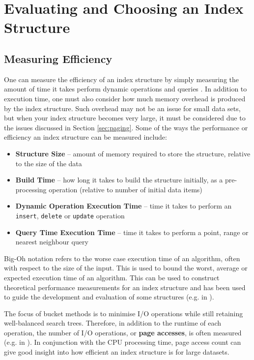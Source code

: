 \section{Evaluating and Choosing an Index Structure}
\label{sec:comparison}

\subsection{Measuring Efficiency}
\label{sec:measuring-efficiency}

One can measure the efficiency of an index structure by simply measuring the amount of time it takes perform dynamic operations and queries \cite{dynamic-data-structures}. In addition to execution time, one must also consider how much memory overhead is produced by the index structure. Such overhead may not be an issue for small data sets, but when your index structure becomes very large, it must be considered due to the issues discussed in Section \ref{sec:paging}. Some of the ways the performance or efficiency an index structure can be measured include:
\begin{itemize}
	\item \textbf{Structure Size} -- amount of memory required to store the structure, relative to the size of the data
	\item \textbf{Build Time} -- how long it takes to build the structure initially, as a pre-processing operation (relative to number of initial data items)
	\item \textbf{Dynamic Operation Execution Time} -- time it takes to perform an \texttt{insert}, \texttt{delete} or \texttt{update} operation
	\item \textbf{Query Time Execution Time} -- time it takes to perform a point, range or nearest neighbour query
\end{itemize}
Big-Oh notation \cite{design-analysis-algorithms} refers to the worse case execution time of an algorithm, often with respect to the size of the input. This is used to bound the worst, average or expected execution time of an algorithm. This can be used to construct theoretical performance measurements for an index structure and has been used to guide the development and evaluation of some structures (e.g. in  \cite{splay-quadtree}).

The focus of bucket methods is to minimise I/O operations while still retaining well-balanced search trees. Therefore, in addition to the runtime of each operation, the number of I/O operations, or \textbf{page accesses}, is often measured (e.g. in  \cite{pk-tree, pyramid-tree, x-tree}). In conjunction with the CPU processing time, page access count can give good insight into how efficient an index structure is for large datasets.

